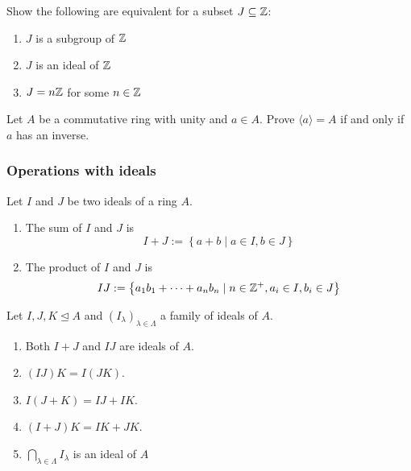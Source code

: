\documentclass[11pt,a4paper]{article}
\begin{document}
\begin{eje}
Show the following are equivalent for a subset \(J\subseteq \mathbb{Z}\):
\begin{enumerate}[label=(\roman*)]
\item \(J\) is a subgroup of \(\mathbb{Z}\)
\item \(J\) is an ideal of \(\mathbb{Z}\)
\item \(J = n \mathbb{Z}\) for some \(n\in \mathbb{Z}\)
\end{enumerate}
\end{eje}

\begin{eje}
    Let \(A\) be a commutative ring with unity and \(a\in A\).
    Prove \(\langle a \rangle  = A\) if and only if \(a\) has an inverse.
\end{eje}



\subsubsection{Operations with ideals}


\begin{defi}\label{def:sum.and.product.of.ideals}
Let \(I\) and \(J\) be two ideals of a ring \(A\).
\begin{enumerate}[label=(\roman*)]
\item  The sum of \(I\) and \(J\) is 
\[I+J := \left\{ a+b \mid a \in I, b\in J \right\}\]
\item The product of \(I\) and \(J\) is 
\[IJ := \left\{ a_1b_1 +\cdots + a_nb_n \mid  n\in\mathbb{Z}^+ , a_i \in I, b_i\in J\right\}\]
\end{enumerate}
\end{defi}

\begin{prop}
    Let \(I,J,K\trianglelefteq A\) and \(\left( I_\lambda \right)_{\lambda\in\Lambda}\)   a family of ideals of \(A\).
\begin{enumerate}[label=(\roman*)]
    \item Both \(I+J\) and \(IJ\) are ideals of  \(A\).
    \item $(I J) K=I(J K)$.
    \item $I(J+K)=I J+I K$.
    \item $(I+J) K=I K+J K$.
    \item \(\bigcap\limits_{\lambda \in \Lambda} I_\lambda\) is an ideal of \(A\)
\end{enumerate}
\end{prop}
\end{document}
